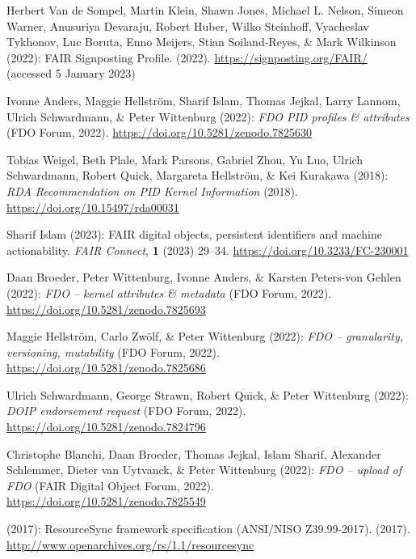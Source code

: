 \begin{thebibliography}{9}
Herbert Van de Sompel, Martin Klein, Shawn Jones, Michael L. Nelson,
Simeon Warner, Anusuriya Devaraju, Robert Huber, Wilko Steinhoff,
Vyacheslav Tykhonov, Luc Boruta, Enno Meijers, Stian Soiland-Reyes, \&
Mark Wilkinson (2022): {FAIR Signposting Profile}. (2022).
\url{https://signposting.org/FAIR/} (accessed 5 January 2023)

Ivonne Anders, Maggie Hellström, Sharif Islam, Thomas Jejkal, Larry
Lannom, Ulrich Schwardmann, \& Peter Wittenburg (2022): \emph{{FDO PID}
profiles \& attributes} ({FDO Forum}, 2022).
\url{https://doi.org/10.5281/zenodo.7825630}

Tobias Weigel, Beth Plale, Mark Parsons, Gabriel Zhou, Yu Luo, Ulrich
Schwardmann, Robert Quick, Margareta Hellström, \& Kei Kurakawa (2018):
\emph{{RDA Recommendation} on {PID Kernel Information}} (2018).
\url{https://doi.org/10.15497/rda00031}

Sharif Islam (2023): {FAIR} digital objects, persistent identifiers and
machine actionability. \emph{FAIR Connect}, \textbf{1} (2023) 29--34.
\url{https://doi.org/10.3233/FC-230001}

Daan Broeder, Peter Wittenburg, Ivonne Anders, \& Karsten Peters-von
Gehlen (2022): \emph{{FDO} -- kernel attributes \& metadata} ({FDO
Forum}, 2022).
\url{https://doi.org/10.5281/zenodo.7825693}

Maggie Hellström, Carlo Zwölf, \& Peter Wittenburg (2022): \emph{{FDO}
-- granularity, versioning, mutability} ({FDO Forum}, 2022).
\url{https://doi.org/10.5281/zenodo.7825686}

Ulrich Schwardmann, George Strawn, Robert Quick, \& Peter Wittenburg
(2022): \emph{{DOIP} endorsement request} ({FDO Forum}, 2022).
\url{https://doi.org/10.5281/zenodo.7824796}

Christophe Blanchi, Daan Broeder, Thomas Jejkal, Islam Sharif, Alexander
Schlemmer, Dieter van Uytvanck, \& Peter Wittenburg (2022): \emph{{FDO}
-- upload of {FDO}} ({FAIR Digital Object Forum}, 2022).
\url{https://doi.org/10.5281/zenodo.7825549}

(2017): {ResourceSync} framework specification ({ANSI/NISO
Z39.99-2017}). (2017).
\url{http://www.openarchives.org/rs/1.1/resourcesync}


\end{thebibliography}
